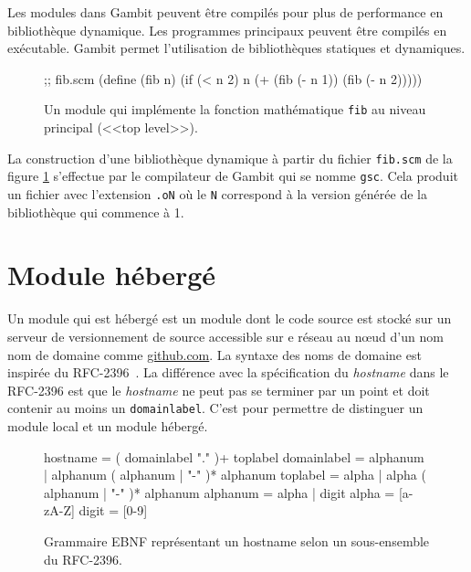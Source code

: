 Les modules dans Gambit peuvent être compilés pour plus de performance en
bibliothèque dynamique. Les programmes principaux peuvent être compilés en
exécutable.  Gambit permet l'utilisation de bibliothèques statiques et
dynamiques.\\

\begin{figure}[ht]
  \centering

  \begin{mplisting}{0.5}
;; fib.scm
(define (fib n)
  (if (< n 2)
      n
      (+ (fib (- n 1))
         (fib (- n 2)))))
\end{mplisting}
  \caption{Un module qui implémente la fonction mathématique \texttt{fib}
    au niveau principal (<<top level>>).}
  \label{fig:basic_fib_module}
\end{figure}

La construction d'une bibliothèque dynamique à partir du fichier \texttt{fib.scm}
de la figure \ref{fig:basic_fib_module} s'effectue par le compilateur de Gambit
qui se nomme \texttt{gsc}. Cela produit un fichier avec l'extension \texttt{.oN}
où le \texttt{N} correspond à la version générée de la bibliothèque qui commence à 1.


\section{Module hébergé}

Un module qui est hébergé est un module dont le code source est stocké sur un
serveur de versionnement de source accessible sur e réseau au nœud d'un nom nom
de domaine comme \url{github.com}. La syntaxe des noms de domaine est inspirée
du RFC-2396~\cite{RFC:URI-2396}.  La différence avec la spécification du
\textit{hostname} dans le RFC-2396 est que le \textit{hostname} ne peut pas se
terminer par un point et doit contenir au moins un \verb|domainlabel|. C'est
pour permettre de distinguer un module local et un module hébergé. \\

\begin{figure}[ht]
  \centering
  \lstset{frame=single}
  \begin{mplisting}{0.9}
hostname      = ( domainlabel "." )+ toplabel
domainlabel   = alphanum | alphanum ( alphanum | "-" )* alphanum
toplabel      = alpha | alpha ( alphanum | "-" )* alphanum
alphanum      = alpha | digit
alpha         = [a-zA-Z]
digit         = [0-9]
\end{mplisting}
  \caption{Grammaire EBNF représentant un hostname selon un sous-ensemble du
  RFC-2396.}
  \label{fig:hostname->grammar}
\end{figure}


